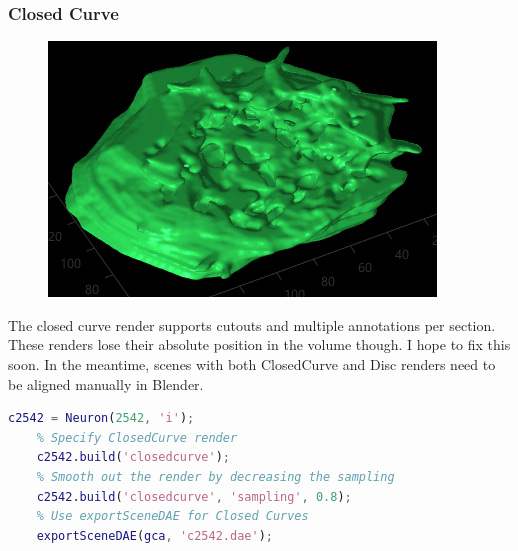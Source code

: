 \documentclass[12pt]{exam}
\begin{document}
	\subsubsection{Closed Curve}
	\begin{figure}
		\includegraphics[width=\linewidth]{lmcone_render}
		\label{lmconeRender}
	\end{figure}
	The closed curve render supports cutouts and multiple annotations per section. These renders lose their absolute position in the volume though. I hope to fix this soon. In the meantime, scenes with both ClosedCurve and Disc renders need to be aligned manually in Blender.
	\begin{lstlisting}[language=matlab]
	c2542 = Neuron(2542, 'i');
	% Specify ClosedCurve render
	c2542.build('closedcurve');
	% Smooth out the render by decreasing the sampling
	c2542.build('closedcurve', 'sampling', 0.8);
	% Use exportSceneDAE for Closed Curves
	exportSceneDAE(gca, 'c2542.dae');\end{lstlisting}
	
\end{document}
